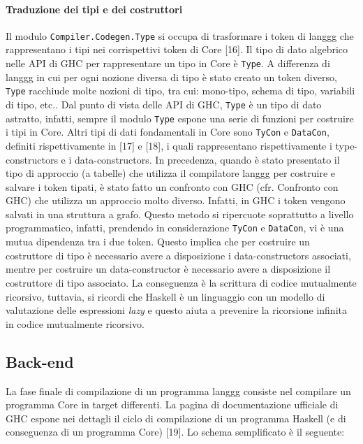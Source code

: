 \documentclass[10pt,a4paper]{article}
\begin{document}
\paragraph{Traduzione dei tipi e dei costruttori}
Il modulo \texttt{Compiler.Codegen.Type} si occupa di trasformare i token di langgg che rappresentano i tipi nei
corrispettivi token di Core [16]. Il tipo di dato algebrico nelle API di GHC per rappresentare un tipo in Core è
\texttt{Type}. A differenza di langgg in cui per ogni nozione diversa di tipo è stato creato un token diverso,
\texttt{Type} racchiude molte nozioni di tipo, tra cui: mono-tipo, schema di tipo, variabili di tipo, etc.. Dal
punto di vista delle API di GHC, \texttt{Type} è un tipo di dato astratto, infatti, sempre il modulo \texttt{Type}
espone una serie di funzioni per costruire i tipi in Core. Altri tipi di dati fondamentali in Core sono \texttt{TyCon} e
\texttt{DataCon}, definiti rispettivamente in [17] e [18], i quali rappresentano rispettivamente i type-constructors e
i data-constructors. In precedenza, quando è stato presentato il tipo di approccio (a tabelle) che utilizza il
compilatore langgg
per costruire e salvare i token tipati, è stato fatto un confronto con GHC (cfr. Confronto con GHC) che utilizza un
approccio molto diverso. Infatti, in GHC i token vengono salvati in una struttura a grafo. Questo metodo si
ripercuote soprattutto a livello programmatico, infatti, prendendo in considerazione \texttt{TyCon} e \texttt{DataCon},
vi è una mutua dipendenza tra i due token. Questo implica che per costruire un costruttore di tipo è
necessario avere a disposizione i data-constructors associati, mentre per costruire un data-constructor è necessario avere a
disposizione il costruttore di tipo associato. La conseguenza è la scrittura di codice mutualmente ricorsivo, tuttavia,
si ricordi che Haskell è un linguaggio con un modello di valutazione delle espressioni \textit{lazy} e questo aiuta a
prevenire la ricorsione infinita in codice mutualmente ricorsivo.

\subsection{Back-end}
La fase finale di compilazione di un programma langgg consiste nel compilare un programma Core in target differenti.
La pagina di documentazione ufficiale di GHC espone nei dettagli il ciclo di compilazione di un programma Haskell (e
di conseguenza di un programma Core) [19]. Lo schema semplificato è il seguente:
\newline
\end{document}

